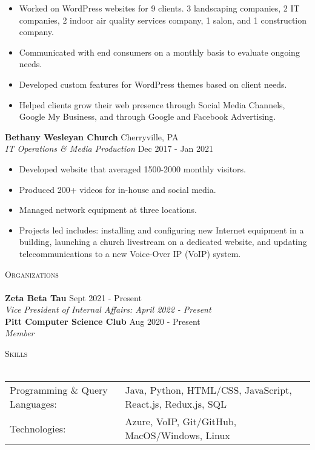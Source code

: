 \documentclass[letterpaper]{article}
\newcommand{\lineunder} {
    \vspace*{-8pt} \\
    \hspace*{-18pt} \hrulefill \\
}
\newcommand{\header} [1] {
    {\hspace*{-18pt}\vspace*{6pt} \textsc{#1}}
    \vspace*{-6pt} \lineunder
}
\begin{document}
\begin{itemize} \itemsep 1pt
	\item Worked on WordPress websites for 9 clients. 3 landscaping companies, 2 IT companies, 2 indoor air quality services company, 1 salon, and 1 construction company.
    \item Communicated with end consumers on a monthly basis to evaluate ongoing needs.
    \item Developed custom features for WordPress themes based on client needs.
	\item Helped clients grow their web presence through Social Media Channels, Google My Business, and through Google and Facebook Advertising.
\end{itemize}
\textbf{Bethany Wesleyan Church} \hfill Cherryville, PA\\
\textit{IT Operations \& Media Production} \hfill Dec 2017 - Jan 2021\\
\vspace{-1mm}
\begin{itemize} \itemsep 1pt
	\item Developed website that averaged 1500-2000 monthly visitors.
	\item Produced 200+ videos for in-house and social media.
    \item Managed network equipment at three locations.
    \item Projects led includes: installing and configuring new Internet equipment in a building, launching a church livestream on a dedicated website, and updating telecommunications to a new Voice-Over IP (VoIP) system.
\end{itemize}

\header{Organizations}
\textbf{Zeta Beta Tau} \hfill Sept 2021 - Present\\
\textit{Vice President of Internal Affairs: April 2022 - Present} \\
\vspace{1mm}
\textbf{Pitt Computer Science Club} \hfill Aug 2020 - Present\\
\textit{Member} \\
\vspace{2mm}

\header{Skills}
\begin{tabular}{ l l }
	Programming \& Query Languages: & Java, Python, HTML/CSS, JavaScript, React.js, Redux.js, SQL       \\
	Technologies:                   			  & Azure, VoIP, Git/GitHub, MacOS/Windows, Linux \\
\end{tabular}
\vspace{2mm}


\
\end{document}
